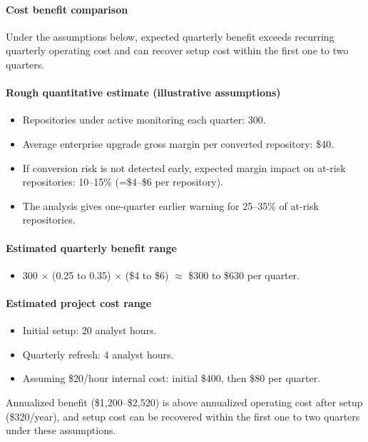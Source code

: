 \paragraph{Cost benefit comparison}
Under the assumptions below, expected quarterly benefit exceeds recurring quarterly operating cost and can recover setup cost within the first one to two quarters.

\paragraph{Rough quantitative estimate (illustrative assumptions)}
\begin{itemize}
  \item Repositories under active monitoring each quarter: 300.
  \item Average enterprise upgrade gross margin per converted repository: \$40.
  \item If conversion risk is not detected early, expected margin impact on at-risk repositories: 10--15\% (=\$4--\$6 per repository).
  \item The analysis gives one-quarter earlier warning for 25--35\% of at-risk repositories.
\end{itemize}

\paragraph{Estimated quarterly benefit range}
\begin{itemize}
  \item 300 $\times$ (0.25 to 0.35) $\times$ (\$4 to \$6) $\approx$ \$300 to \$630 per quarter.
\end{itemize}

\paragraph{Estimated project cost range}
\begin{itemize}
  \item Initial setup: 20 analyst hours.
  \item Quarterly refresh: 4 analyst hours.
  \item Assuming \$20/hour internal cost: initial \$400, then \$80 per quarter.
\end{itemize}

Annualized benefit (\$1{,}200--\$2{,}520) is above annualized operating cost after setup (\$320/year), and setup cost can be recovered within the first one to two quarters under these assumptions.

